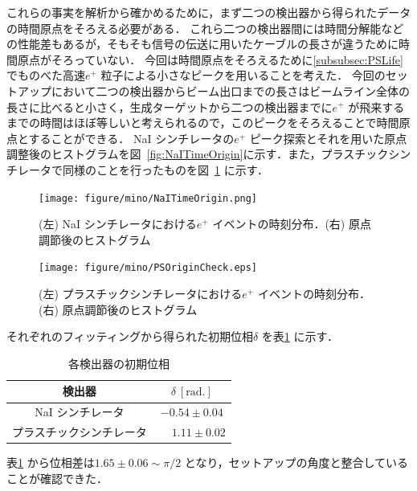 これらの事実を解析から確かめるために，まず二つの検出器から得られたデータの時間原点をそろえる必要がある．
これら二つの検出器間には時間分解能などの性能差もあるが，そもそも信号の伝送に用いたケーブルの長さが違うために時間原点がそろっていない．
今回は時間原点をそろえるために\ref{subsubsec:PSLife} でものべた高速$e^{+}$ 粒子による小さなピークを用いることを考えた．
今回のセットアップにおいて二つの検出器からビーム出口までの長さはビームライン全体の長さに比べると小さく，生成ターゲットから二つの検出器までに$e^{+}$ が飛来するまでの時間はほぼ等しいと考えられるので，このピークをそろえることで時間原点とすることができる．
NaI シンチレータの$e^{+}$ ピーク探索とそれを用いた原点調整後のヒストグラムを図~\ref{fig:NaITimeOrigin}に示す．また，プラスチックシンチレータで同様のことを行ったものを図~\ref{fig:PSTimeOrigin} に示す．
\begin{figure}[h]
	\centering
	\texttt{[image: figure/mino/NaITimeOrigin.png]}
	\caption{(左) NaI シンチレータにおける$e^{+}$ イベントの時刻分布．(右) 原点調節後のヒストグラム}
	\label{fig:NaITimeOrigin}
	\texttt{[image: figure/mino/PSOriginCheck.eps]}
	\caption{(左) プラスチックシンチレータにおける$e^{+}$ イベントの時刻分布．(右) 原点調節後のヒストグラム}
	\label{fig:PSTimeOrigin}
\end{figure}

それぞれのフィッティングから得られた初期位相$\delta$ を表\ref{tab:InitPhases} に示す．
\begin{table}[h]
	\centering
	\caption{各検出器の初期位相}
	\begin{tabular}{cc}\toprule
	検出器 & $\delta~[\mathrm{rad.}]$ \\ \midrule
	NaI シンチレータ & $-0.54 \pm 0.04$ \\
	プラスチックシンチレータ & $\phantom{-}1.11 \pm 0.02$ \\ \bottomrule
	\end{tabular}\label{tab:InitPhases}
\end{table}%
表\ref{tab:InitPhases} から位相差は$1.65 \pm 0.06 \sim \pi / 2$ となり，セットアップの角度と整合していることが確認できた．

%
